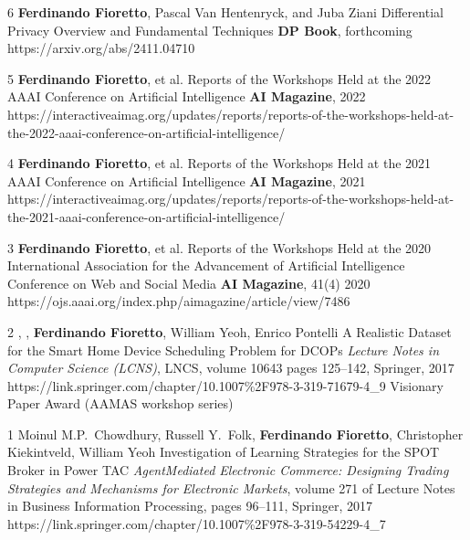 \begin{pubs}
\journalentry
	{6} %
	{{\bf Ferdinando Fioretto}, Pascal Van Hentenryck, and Juba Ziani}
	{Differential Privacy Overview and Fundamental Techniques}
	{{\bf DP Book}, forthcoming}
	{https://arxiv.org/abs/2411.04710}

\journalentry
	{5} %
	{{\bf Ferdinando Fioretto}, et al.} 
	{Reports of the Workshops Held at the 2022 AAAI Conference on Artificial Intelligence}
	{{\bf AI Magazine}, 2022}
	{https://interactiveaimag.org/updates/reports/reports-of-the-workshops-held-at-the-2022-aaai-conference-on-artificial-intelligence/}

\journalentry
	{4} %
	{{\bf Ferdinando Fioretto}, et al.} 
	{Reports of the Workshops Held at the 2021 AAAI Conference on Artificial Intelligence}
	{{\bf AI Magazine}, 2021}
	{https://interactiveaimag.org/updates/reports/reports-of-the-workshops-held-at-the-2021-aaai-conference-on-artificial-intelligence/}

\journalentry
	{3} %
	{{\bf Ferdinando Fioretto}, et al.} 
	{Reports of the Workshops Held at the 2020 International Association for the Advancement of Artificial Intelligence Conference on Web and Social Media}
	{{\bf AI Magazine},  41(4) 2020}
	{https://ojs.aaai.org/index.php/aimagazine/article/view/7486}

\journalentryAwd
	{2} %
	{, , {\bf Ferdinando Fioretto}, William Yeoh, Enrico Pontelli}
	{A Realistic Dataset for the Smart Home Device Scheduling Problem for DCOPs}
	{\emph{Lecture Notes in Computer Science (LCNS)}, LNCS, volume 10643 pages 125--142, Springer, 2017}
	{https://link.springer.com/chapter/10.1007\%2F978-3-319-71679-4\_9}
	{Visionary Paper Award}
	{(AAMAS workshop series)}

\journalentry
	{1} %
	{Moinul M.P.~Chowdhury, Russell Y.~Folk, {\bf Ferdinando Fioretto}, Christopher Kiekintveld, William Yeoh}
	{Investigation of Learning Strategies for the SPOT Broker in Power TAC}
	{\emph{AgentMediated Electronic Commerce: Designing Trading Strategies and Mechanisms for Electronic Markets}, volume 271 of Lecture Notes in Business Information Processing, 
	    pages 96–111, Springer, 2017}
    {https://link.springer.com/chapter/10.1007\%2F978-3-319-54229-4\_7}
\end{pubs}


